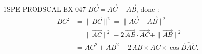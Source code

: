 \begin{corrige}{1SPE-PRODSCAL-EX-047}
$\overrightarrow{BC} = \overrightarrow{AC} - \overrightarrow{AB}$, donc :
\begin{align*}
BC^2 &= \|\overrightarrow{BC}\|^2 = \|\overrightarrow{AC} - \overrightarrow{AB}\|^2 \\
&= \|\overrightarrow{AC}\|^2 - 2\,\overrightarrow{AB} \cdot \overrightarrow{AC} + \|\overrightarrow{AB}\|^2 \\
&= AC^2 + AB^2 - 2\,AB \times AC \times \cos\widehat{BAC}.
\end{align*}
\end{corrige}

